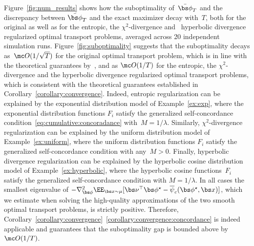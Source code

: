 \documentclass[11pt, a4paper, oneside, reqno]{article}
\begin{document}
    
    Figure~\ref{fig:num_results} shows how the suboptimality of~$\bar{\bs \phi}_T$ and the discrepancy between $\bar {\bs \phi}_T$ and the exact maximizer decay with~$T$, both for the original as well as for the entropic, the $\chi^2$-divergence and~{\color{black} hyperbolic divergence} regularized optimal transport problems, {\color{black} averaged across 20 independent simulation runs.}
    Figure~\ref{fig:suboptimality} suggests that the suboptimality decays as~$\mc O(1/\sqrt{T})$  for the original optimal transport problem, which is in line with the theoretical guarantees by~\citet[Corollary~1]{nesterov2008confidence},
    and as $\mc O(1/ T)$ for the {\color{black} entropic, the $\chi^2$-divergence and the hyperbolic divergence regularized} optimal transport problems, which is consistent with the theoretical guarantees established in Corollary~\ref{corollary:convergence}. Indeed, entropic regularization can be explained by the exponential distribution model of Example~\ref{ex:exp}, where the exponential distribution functions $F_i$ satisfy the generalized self-concordance condition~\eqref{eq:cumulative:concoradance} with~$M =1/ \lambda$. Similarly, $\chi^2$-divergence regularization can be explained by the uniform distribution model of Example~\ref{ex:uniform}, where the uniform distribution functions $F_i$ satisfy the generalized self-concordance condition with any~$M > 0$. {\color{black} Finally, hyperbolic divergence regularization can be explained by the hyperbolic cosine distribution model of Example~\ref{ex:hyperbolic}, where the hyperbolic cosine functions~$F_i$ satisfy the generalized self-concordance condition with $M = 1/\lambda$.} In all cases the smallest eigenvalue of $-\nabla_{\bs \phi}^2 \EE_{\bs x \sim \mu} [\bs \nu^\top \bs \phi^\star - \overline{\psi}_{c}(\bs \phi^\star, \bs x)]$, which we estimate when solving the high-quality approximations of the two smooth optimal transport problems, is strictly positive. Therefore, Corollary~\ref{corollary:convergence}~\ref{corollary:convergence:concordance} is indeed applicable and guarantees that the suboptimality gap is bounded above by~$\mc O (1/T)$.
\end{document}
